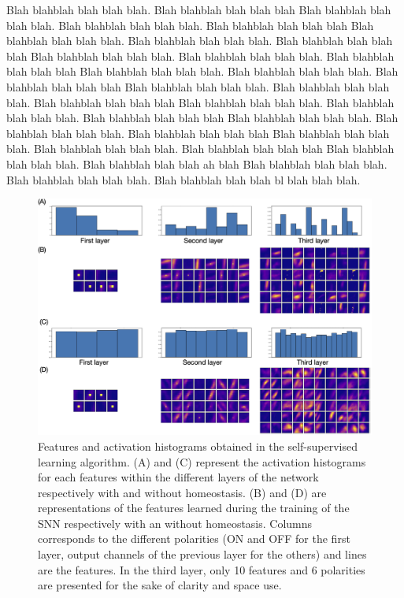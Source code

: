 \documentclass[12pt]{article}
\begin{document}
Blah blahblah blah blah blah. Blah blahblah blah blah blah Blah blahblah blah blah blah.
Blah blahblah blah blah blah. Blah blahblah blah blah blah Blah blahblah blah blah blah.
Blah blahblah blah blah blah. Blah blahblah blah blah blah Blah blahblah blah blah blah.
Blah blahblah blah blah blah. Blah blahblah blah blah blah Blah blahblah blah blah blah.
Blah blahblah blah blah blah. Blah blahblah blah blah blah Blah blahblah blah blah blah.
Blah blahblah blah blah blah. Blah blahblah blah blah blah Blah blahblah blah blah blah.
Blah blahblah blah blah blah. Blah blahblah blah blah blah Blah blahblah blah blah blah.
Blah blahblah blah blah blah. Blah blahblah blah blah blah Blah blahblah blah blah blah.
Blah blahblah blah blah blah. Blah blahblah blah blah blah Blah blahblah blah blah blah.
Blah blahblah blah blah ah blah Blah blahblah blah blah blah.
Blah blahblah blah blah blah. Blah blahblah blah blah bl blah blah blah.
%
\begin{figure}
\centering
\includegraphics[width=.95\linewidth]{layerz.png}
\caption
{Features and activation histograms obtained in the self-supervised learning algorithm. (A) and (C) represent the activation histograms for each features within the different layers of the network respectively with and without homeostasis. (B) and (D) are representations of the features learned during the training of the SNN respectively with an without homeostasis. Columns corresponds to the different polarities (ON and OFF for the first layer, output channels of the previous layer for the others) and lines are the features. In the third layer, only 10 features and 6 polarities are presented for the sake of clarity and space use.
\label{fig:fig2}
}
\end{figure}
\end{document}
